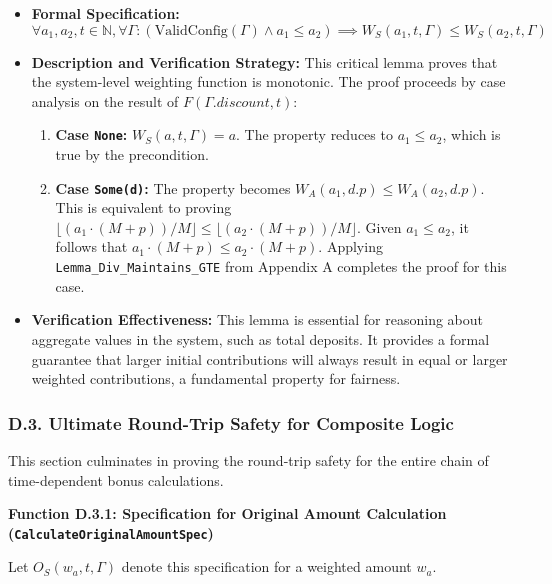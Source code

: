 \documentclass[
  english,
  onecolumn]{article}
\providecommand{\tightlist}{%
  \setlength{\itemsep}{0pt}\setlength{\parskip}{0pt}}
\begin{document}
\begin{itemize}
\tightlist
\item
  \textbf{Formal Specification:} \[
  \forall a_1, a_2, t \in \mathbb{N}, \forall \Gamma : (\text{ValidConfig}(\Gamma) \land a_1 \le a_2) \implies W_S(a_1, t, \Gamma) \le W_S(a_2, t, \Gamma)
  \]
\item
  \textbf{Description and Verification Strategy:} This critical lemma
  proves that the system-level weighting function is monotonic. The
  proof proceeds by case analysis on the result of
  \(F(\Gamma.discount, t)\):

  \begin{enumerate}
  \def\labelenumi{\arabic{enumi}.}
  \tightlist
  \item
    \textbf{Case \texttt{None}:} \(W_S(a, t, \Gamma) = a\). The property
    reduces to \(a_1 \le a_2\), which is true by the precondition.
  \item
    \textbf{Case \texttt{Some(d)}:} The property becomes
    \(W_A(a_1, d.p) \le W_A(a_2, d.p)\). This is equivalent to proving
    \(\lfloor(a_1 \cdot (M+p))/M\rfloor \le \lfloor(a_2 \cdot (M+p))/M\rfloor\).
    Given \(a_1 \le a_2\), it follows that
    \(a_1 \cdot (M+p) \le a_2 \cdot (M+p)\). Applying
    \texttt{Lemma\_Div\_Maintains\_GTE} from Appendix A completes the
    proof for this case.
  \end{enumerate}
\item
  \textbf{Verification Effectiveness:} This lemma is essential for
  reasoning about aggregate values in the system, such as total
  deposits. It provides a formal guarantee that larger initial
  contributions will always result in equal or larger weighted
  contributions, a fundamental property for fairness.
\end{itemize}

\subsubsection{D.3. Ultimate Round-Trip Safety for Composite
Logic}\label{d.3.-ultimate-round-trip-safety-for-composite-logic}

This section culminates in proving the round-trip safety for the entire
chain of time-dependent bonus calculations.

\textbf{Function D.3.1: Specification for Original Amount Calculation
(\texttt{CalculateOriginalAmountSpec})}

Let \(O_S(w_a, t, \Gamma)\) denote this specification for a weighted
amount \(w_a\).
\end{document}
